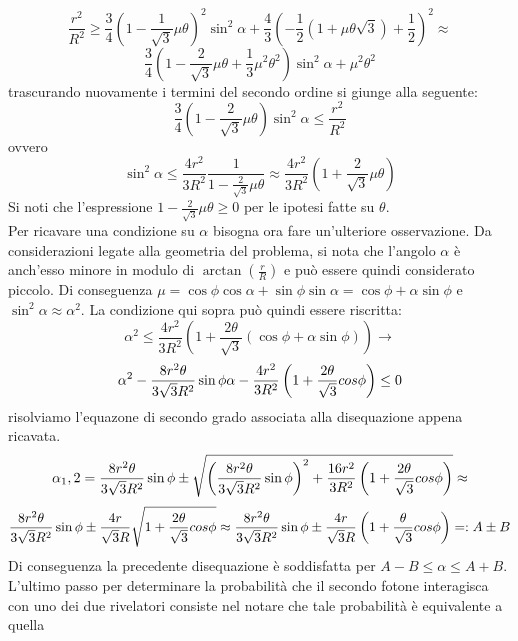   $$ \frac{r^2}{R^2} \ge \frac{3}{4} \left(1 - \frac{1}{\sqrt{3}} \mu \theta \right)^2 \sin^2 \alpha + \frac{4}{3} \left( -\frac{1}{2} \left( 1 + \mu \theta \sqrt{3} \right) + \frac{1}{2} \right)^2 \approx  $$
  $$ \frac{3}{4} \left(1 - \frac{2}{\sqrt{3}} \mu \theta + \frac{1}{3} \mu^2 \theta^2 \right)\sin^2\alpha + \mu^2 \theta^2 $$
  trascurando nuovamente i termini del secondo ordine si giunge alla seguente:
  $$ \frac{3}{4} \left(1 - \frac{2}{\sqrt{3}} \mu \theta \right)\sin^2\alpha \le \frac{r^2}{R^2} $$
  ovvero
  $$ \sin^2\alpha \le \frac{4r^2}{3R^2} \frac{1}{1 - \frac{2}{\sqrt{3}} \mu \theta} \approx \frac{4r^2}{3R^2} \left(1 + \frac{2}{\sqrt{3}} \mu \theta \right)  $$
  Si noti che l'espressione \(1 - \frac{2}{\sqrt{3}} \mu \theta \ge 0\) per le ipotesi fatte su \(\theta\).\\
  Per ricavare una condizione su \(\alpha\) bisogna ora fare un'ulteriore osservazione. Da considerazioni legate alla geometria del problema, si nota che l'angolo \(\alpha\) è anch'esso
  minore in modulo di \(\arctan\left( \frac{r}{R} \right)\) e può essere quindi considerato piccolo. Di conseguenza \(\mu = \cos \phi \cos \alpha + \sin \phi \sin \alpha = \cos \phi + \alpha \sin \phi \)
  e \(\sin^2 \alpha \approx \alpha^2\). La condizione qui sopra può quindi essere riscritta:
  $$ \alpha^2 \le  \frac{4r^2}{3R^2} \left(1 + \frac{2\theta}{\sqrt{3}} \left( \cos \phi + \alpha \sin \phi \right)  \right)  \to $$
  $$ \alpha^2 -\frac{8r^2\theta}{3\sqrt{3}R^2}\sin \phi \alpha -\frac{4r^2}{3R^2}\left( 1 +\frac{2 \theta}{\sqrt{3}} \\cos \phi \right) \le 0 $$
  risolviamo l'equazone di secondo grado associata alla disequazione appena ricavata.
  $$ \alpha{_1,2} = \frac{8r^2\theta}{3\sqrt{3}R^2}\sin \phi \pm \sqrt{ \left( \frac{8r^2\theta}{3\sqrt{3}R^2}\sin \phi \right)^2 + \frac{16r^2}{3R^2}\left( 1 +\frac{2 \theta}{\sqrt{3}} \\cos \phi \right)} \approx $$
  $$ \frac{8r^2\theta}{3\sqrt{3}R^2}\sin \phi \pm \frac{4r}{\sqrt{3}R}\sqrt{ 1 +\frac{2 \theta}{\sqrt{3}} \\cos \phi} \approx \frac{8r^2\theta}{3\sqrt{3}R^2}\sin \phi \pm \frac{4r}{\sqrt{3}R}\left( 1 +\frac{\theta}{\sqrt{3}} \\cos \phi \right) =: A \pm B$$
  Di conseguenza la precedente disequazione è soddisfatta per \(A-B\le \alpha \le A + B\).\\
  L'ultimo passo per determinare la probabilità che il secondo fotone interagisca con uno dei due rivelatori consiste nel notare che tale probabilità è equivalente a quella
